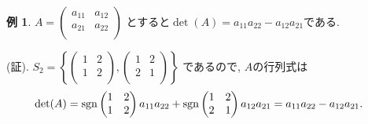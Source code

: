 \documentclass[dvipdfmx,a4paper,11pt]{article}
\newcommand{\sgn}{{\rm sgn}}
\theoremstyle{definition}
\newtheorem{exa}[thm]{例}
\begin{document}
\begin{exa}
\label{2jidet}
$A = 
  \begin{pmatrix}
a_{11}& a_{12}\\
a_{21}& a_{22}\\
 \end{pmatrix} 
$
とすると$\det(A) = a_{11}a_{22} - a_{12}a_{21}$である.

(証).
$S_2 = \left\{   \begin{pmatrix}
1& 2\\
1& 2\\
 \end{pmatrix} , 
   \begin{pmatrix}
1&2\\
2& 1\\
 \end{pmatrix} 
  \right\}$
  であるので, $A$の行列式は
  \begin{align*}
  \det(A) &= 
  \sgn \begin{pmatrix}
1& 2\\
1& 2\\
 \end{pmatrix} a_{11}a_{22}
 +
  \sgn \begin{pmatrix}
1& 2\\
2& 1\\
 \end{pmatrix} a_{12}a_{21}
 =
 a_{11}a_{22} - a_{12}a_{21}.
  \end{align*}

\end{exa}
\end{document}
